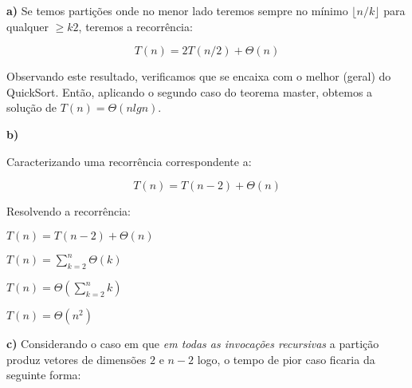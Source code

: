 \documentclass[a4paper,12pt]{article}
\begin{document}
\begin{description}
  \item{\textbf{a)}} Se temos partições onde no menor lado teremos sempre no mínimo $\lfloor n/k \rfloor$ para qualquer $\geq k 2$, teremos a recorrência:
  	
 $$T(n) = 2T(n/2) + \Theta(n)$$

 Observando este resultado, verificamos que se encaixa com o melhor (geral) do QuickSort. Então, aplicando o segundo caso do teorema master, obtemos a solução de $T(n) = \Theta(n lg n)$.

	\item{\textbf{b)}}


	Caracterizando uma recorrência correspondente a:

	$$T(n) = T(n-2) + \Theta(n)$$

	Resolvendo a recorrência:

	$T(n) = T(n-2) + \Theta(n)$

	$T(n) = \sum_{k=2}^n \Theta(k)$

	$T(n) = \Theta(\sum_{k=2}^n k)$

	$T(n) = \Theta(n^2)$

	\item{\textbf{c)}} Considerando o caso em que \textit{em todas as invocações recursivas} a partição produz vetores de dimensões $2$ e $n-2$ logo, o tempo de pior caso ficaria da seguinte forma:
	

\end{description}
\end{document}
